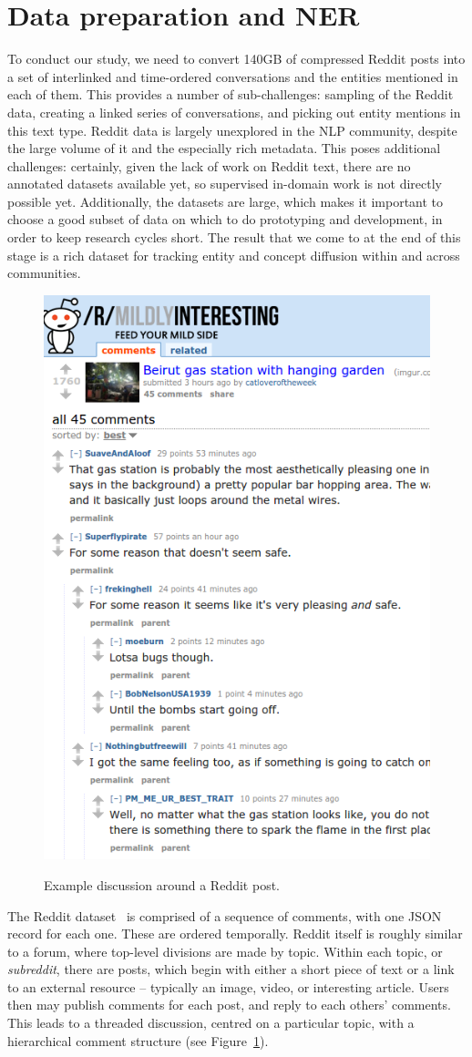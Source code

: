 \documentclass[journal,10pt,draftclsnofoot,onecolumn]{IEEEtran}
\begin{document}
\section{Data preparation and NER}

To conduct our study, we need to convert 140GB of compressed Reddit posts into a set of interlinked and time-ordered conversations and the entities mentioned in each of them.
This provides a number of sub-challenges: sampling of the Reddit data, creating a linked series of conversations, and picking out entity mentions in this text type.
Reddit data is largely unexplored in the NLP community, despite the large volume of it and the especially rich metadata.
This poses additional challenges: certainly, given the lack of work on Reddit text, there are no annotated datasets available yet, so supervised in-domain work is not directly possible yet.
Additionally, the datasets are large, which makes it important to choose a good subset of data on which to do prototyping and development, in order to keep research cycles short.
The result that we come to at the end of this stage is a rich dataset for tracking entity and concept diffusion within and across communities.

\begin{figure}
\centering
\includegraphics[width=0.4\columnwidth]{reddit-example.png}
\label{fig:reddit-example}
\caption{Example discussion around a Reddit post.}
\end{figure}

The Reddit dataset~\cite{reddit-data} is comprised of a sequence of comments, with one JSON record for each one.
These are ordered temporally.
Reddit itself is roughly similar to a forum, where top-level divisions are made by topic.
Within each topic, or {\em subreddit}, there are posts, which begin with either a short piece of text or a link to an external resource -- typically an image, video, or interesting article.
Users then may publish comments for each post, and reply to each others' comments.
This leads to a threaded discussion, centred on a particular topic, with a hierarchical comment structure (see Figure~\ref{fig:reddit-example}).
\end{document}
